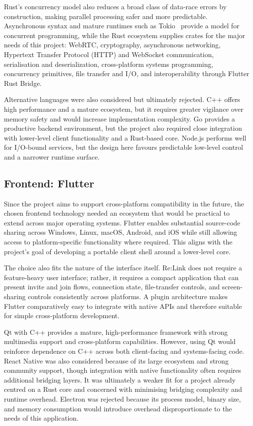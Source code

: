 \documentclass[12pt,a4paper,oneside]{report}
\begin{document}
Rust's concurrency model also reduces a broad class of data-race errors by construction, making parallel processing safer and more predictable. Asynchronous syntax and mature runtimes such as Tokio~\cite{tokio} provide a model for concurrent programming, while the Rust ecosystem supplies crates for the major needs of this project: WebRTC, cryptography, asynchronous networking, Hypertext Transfer Protocol (HTTP) and WebSocket communication, serialisation and deserialization, cross-platform systems programming, concurrency primitives, file transfer and I/O, and interoperability through Flutter Rust Bridge.

Alternative languages were also considered but ultimately rejected. C++ offers high performance and a mature ecosystem, but it requires greater vigilance over memory safety and would increase implementation complexity. Go provides a productive backend environment, but the project also required close integration with lower-level client functionality and a Rust-based core. Node.js performs well for I/O-bound services, but the design here favours predictable low-level control and a narrower runtime surface.


\subsection{Frontend: Flutter}
\label{sec:frontend-flutter}

Since the project aims to support cross-platform compatibility in the future, the chosen frontend technology needed an ecosystem that would be practical to extend across major operating systems. Flutter enables substantial source-code sharing across Windows, Linux, macOS, Android, and iOS while still allowing access to platform-specific functionality where required. This aligns with the project's goal of developing a portable client shell around a lower-level core.

The choice also fits the nature of the interface itself. Re:Link does not require a feature-heavy user interface; rather, it requires a compact application that can present invite and join flows, connection state, file-transfer controls, and screen-sharing controls consistently across platforms. A plugin architecture makes Flutter comparatively easy to integrate with native APIs and therefore suitable for simple cross-platform development.

Qt with C++ provides a mature, high-performance framework with strong multimedia support and cross-platform capabilities. However, using Qt would reinforce dependence on C++ across both client-facing and systems-facing code. React Native was also considered because of its large ecosystem and strong community support, though integration with native functionality often requires additional bridging layers. It was ultimately a weaker fit for a project already centred on a Rust core and concerned with minimising bridging complexity and runtime overhead. Electron was rejected because its process model, binary size, and memory consumption would introduce overhead disproportionate to the needs of this application.
\end{document}
